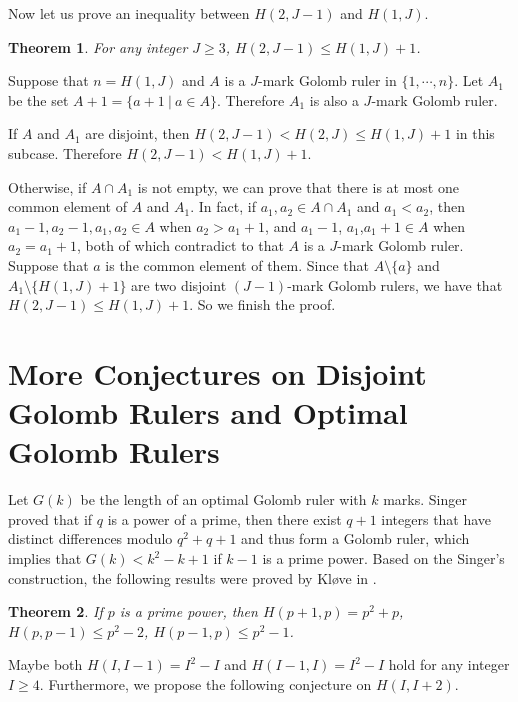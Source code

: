 \documentclass[preprint,12pt]{elsarticle}
\newtheorem{thm}{Theorem}
\begin{document}
Now let us prove an inequality between $H(2,J-1)$ and $H(1,J)$.

\begin{thm} \label{H2j-1}
For any integer $J \geq 3$,
$H(2,J-1) \leq H(1,J)+1$.
\end{thm}
\begin{pf}
Suppose that $n = H(1,J)$ and $A$ is a $J$-mark Golomb ruler
in $\{1, \cdots, n\}$. Let $A_1$ be the set $A+1 = \{a+1 \:| \:a \in A\}$.
Therefore $A_1$ is also a $J$-mark Golomb ruler. 

If $A$ and $A_1$ are disjoint, then $H(2, J-1) < H(2,J) \leq H(1,J)+1$ in this subcase.
Therefore $H(2,J-1) < H(1,J)+1$.

Otherwise, if $A \cap A_1$ is not empty, we can prove that there is at most one common element of $A$ and $A_1$. 
In fact, if $a_1, a_2 \in A \cap A_1$ and $a_1 < a_2$, then $a_1-1, a_2-1, a_1, a_2 \in A$ when $a_2 > a_1+1$, and $a_1-1$, $a_1$,$a_1+1 \in A$ when $a_2 = a_1 +1$, both of which contradict to that 
$A$ is a $J$-mark Golomb ruler. 
Suppose that $a$ is the common element of them.
Since that $A \setminus \{a\}$ and $A_1 \setminus \{H(1,J)+1\}$ are two disjoint
$(J-1)$-mark Golomb rulers, we have that $H(2,J-1) \leq H(1,J) +1$. So we finish the proof. 
\end{pf}






\section{More Conjectures on Disjoint Golomb Rulers and Optimal Golomb Rulers} \label{secmoreconj}

Let $G(k)$ be the length of an optimal Golomb ruler with $k$ marks. Singer proved that if $q$ is a power of a prime, then there exist $q + 1$ integers that have distinct differences modulo $q^2 + q + 1$ and thus
form a Golomb ruler\cite{singer1938theorem}, which implies that $G(k) < k^2-k+1$ if $k-1$ is a prime power.
Based on the Singer's construction,
the following results were proved by Kl{\o}ve in \cite{Klove}.

\vspace{0.3cm}
\begin{thm}
\label{tpp}
If $p$ is a prime power, then
$H(p+1, p) = p^2+p$, $H(p, p-1) \leq p^2-2$, $H(p-1, p) \leq p^2-1$.
\end{thm}
\vspace{0.3cm}

Maybe both
$H(I, I-1) = I^2-I$ and $H(I-1, I) = I^2-I$ hold
for any integer $I \geq 4$.
Furthermore, we propose the following conjecture on $H(I, I+2)$.
\end{document}
